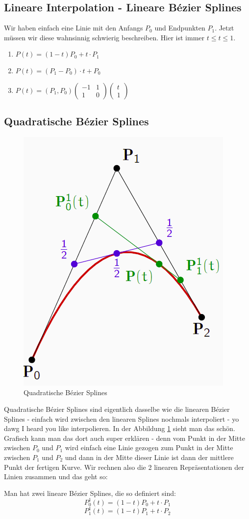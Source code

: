 \subsection{Lineare Interpolation - Lineare Bézier Splines}
Wir haben einfach eine Linie mit den Anfangs \(P_0\) und Endpunkten \(P_1\). Jetzt müssen wir diese wahnsinnig schwierig beschreiben. Hier ist immer \(t \leq t \leq 1\).
\begin{enumerate}
	\item \(P(t) = (1-t)P_0+t\cdot P_1\)
	\item \(P(t) = (P_1 - P_0)\cdot t + P_0\)
	\item \(P(t) = (P_1, P_0) \begin{pmatrix}
	-1 & 1 \\1 & 0
	\end{pmatrix}\begin{pmatrix}
	t \\ 1
	\end{pmatrix}\)
\end{enumerate}
\subsection{Quadratische Bézier Splines}
\begin{figure}[!ht]
	\centering
	\includegraphics[width=0.2\linewidth]{fig/quadratic_bezier_spline}
	\caption{Quadratische Bézier Splines}
	\label{fig:quadratic_bezier_spline}
\end{figure}
Quadratische Bézier Splines sind eigentlich dasselbe wie die linearen Bézier Splines - einfach wird zwischen den linearen Splines nochmals interpoliert - yo dawg I heard you like interpolieren. In der Abbildung \ref{fig:quadratic_bezier_spline} sieht man das schön. Grafisch kann man das dort auch super erklären - denn vom Punkt in der Mitte zwischen \(P_0\) und \(P_1\)  wird einfach eine Linie gezogen zum Punkt in der Mitte zwischen \(P_1\) und \(P_2\) und dann in der Mitte dieser Linie ist dann der mittlere Punkt der fertigen Kurve. Wir rechnen also die 2 linearen Repräsentationen der Linien zusammen und das geht so:

Man hat zwei lineare Bézier Splines, die so definiert sind:
\begin{displaymath}
P^1_0(t) = (1-t)P_0 + t\cdot P_1
\end{displaymath}
\begin{displaymath}
P^1_1(t) = (1-t)P_1 + t\cdot P_2
\end{displaymath}

